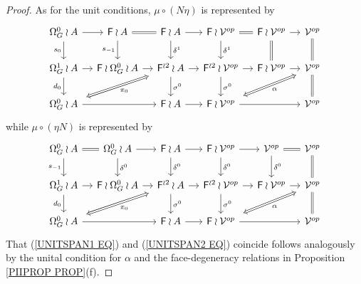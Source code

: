 \documentclass[a4paper,10pt]{article}%
\begin{document}
\begin{proof}
As for the unit conditions, $\mu \circ (N \eta)$ is represented by
\begin{equation}\label{UNITSPAN1 EQ}
	\begin{tikzcd}[column sep=1.05em]
	\Omega_G^0 \wr A \ar{d}[swap]{s_{0}} \ar{r} &
	\Fin \wr A \ar{d}[swap]{s_{-1}} \ar[equal]{r} &
	\Fin \wr A \ar{d}{\delta^1} \ar{r} &
	\Fin \wr \mathcal{V}^{op} \ar{d}{\delta^1} \ar[equal]{r} &
	\Fin \wr \mathcal{V}^{op} \ar[equal]{d} \ar{r} &
	\mathcal{V}^{op} \ar[equal]{d}
\\
	\Omega_{G}^{1} \wr A \ar{r} \ar{d}[swap]{d_{0}}&
	\Fin \wr \Omega_{G}^{0} \wr A \ar{r} &
	|[alias=FFOmega]|\Fin^{\wr 2} \wr A \ar{d}{\sigma^0} \ar{r} &
	\Fin^{\wr 2} \wr \mathcal{V}^{op} \ar{d}{\sigma^0} \ar{r} &
	\Fin \wr \mathcal{V}^{op} \ar{r} &
	|[alias=dog]|
	\mathcal{V}^{op} \ar[equal]{d}
\\
	|[alias=Omega]|\Omega_{G}^0 \wr A \ar{rr}&&
	\Fin \wr A \ar{r} &
	|[alias=cat]|
	\Fin \wr \mathcal{V}^{op} \ar{rr} &&
	\mathcal{V}^{op}
	\arrow[Leftrightarrow, from=FFOmega, to=Omega,shorten <=0.15cm,,shorten >=0.15cm,"\pi_0"]
	\arrow[Leftrightarrow, from=dog, to=cat,shorten <=0.15cm,,shorten >=0.15cm,"\alpha"]
	\end{tikzcd}
\end{equation}
while $\mu \circ (\eta N)$ is represented by 
\begin{equation}\label{UNITSPAN2 EQ}
	\begin{tikzcd}[column sep=1.05em]
	\Omega_G^0 \wr A \ar{d}[swap]{s_{-1}} \ar[equal]{r} &
	\Omega_G^0 \wr A \ar{d}{\delta^0} \ar{r} &
	\Fin \wr A \ar{d}{\delta^0} \ar{r} &
	\Fin \wr \mathcal{V}^{op} \ar{d}{\delta^0} \ar{r} &
	\mathcal{V}^{op} \ar{d}{\delta^0} \ar[equal]{r} &
	\mathcal{V}^{op} \ar[equal]{d}
\\
	\Omega_{G}^{1} \wr A \ar{r} \ar{d}[swap]{d_{0}}&
	\Fin \wr \Omega_{G}^0 \wr A \ar{r} &
	|[alias=FFOmega]|\Fin^{\wr 2} \wr A \ar{d}{\sigma^0} \ar{r} &
	\Fin^{\wr 2} \wr \mathcal{V}^{op} \ar{d}{\sigma^0} \ar{r} &
	\Fin \wr \mathcal{V}^{op} \ar{r} &
	|[alias=dog]|
	\mathcal{V}^{op} \ar[equal]{d}
\\
	|[alias=Omega]|\Omega_{G}^0 \wr A \ar{rr} &&
	\Fin \wr A \ar{r} &
	|[alias=cat]|
	\Fin \wr \mathcal{V}^{op} \ar{rr} &&
	\mathcal{V}^{op}
	\arrow[Leftrightarrow, from=FFOmega, to=Omega,shorten <=0.15cm,,shorten >=0.15cm,"\pi_0"]
	\arrow[Leftrightarrow, from=dog, to=cat,shorten <=0.15cm,,shorten >=0.15cm,"\alpha"]
	\end{tikzcd}
\end{equation}
That (\ref{UNITSPAN1 EQ}) and (\ref{UNITSPAN2 EQ}) coincide follows analogously by the unital condition for $\alpha$
and the face-degeneracy relations in 
Proposition \ref{PIIPROP PROP}(f).
\end{proof}
\end{document}
